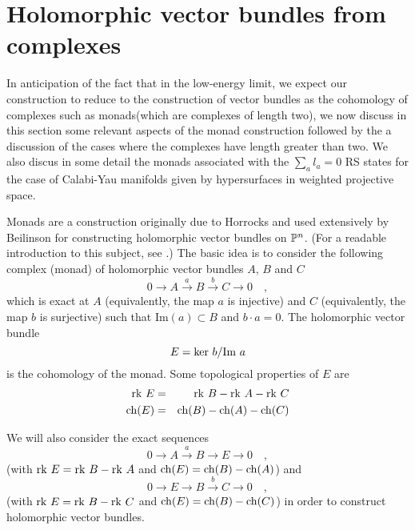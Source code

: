 \documentclass[a4paper,12pt]{article}
\begin{document}
\section{Holomorphic vector bundles from complexes}

In anticipation of the fact that in the low-energy limit, we expect
our construction to reduce to the construction of vector bundles
as the cohomology of complexes such as monads(which are complexes of
length two),
we now discuss in this section
some relevant aspects of the monad construction followed by the a
discussion of the cases where the complexes  have length greater than
two.
We also discus in some detail
the monads associated with the $\sum_al_a=0$ RS states for the case of
Calabi-Yau manifolds given by hypersurfaces in weighted projective
space.


Monads are a construction originally due to Horrocks and used extensively by
Beilinson for constructing holomorphic vector
bundles on $\mathbb P^n$. (For a readable introduction to this subject, see
\cite{okonek}.)
The basic idea is to consider the following complex 
(monad) of holomorphic vector bundles  $A$, $B$ and $C$ 
\begin{equation}
0\rightarrow A \stackrel{a}{\rightarrow} B \stackrel{b}{\rightarrow}
C \rightarrow 0\quad,
\end{equation}
which is exact at $A$ (equivalently, the map $a$ is injective)
and $C$ (equivalently, the map $b$ is surjective)
such that Im$(a)\subset B$ and $b\cdot a=0$.
The holomorphic
vector bundle $$E={\rm ker}\ b/{\rm Im}\ a$$ is the cohomology of the
monad.  Some topological properties of $E$ are
\begin{eqnarray}
{\rm rk}\ E &=& {\rm rk}\ B - {\rm rk}\ A - {\rm rk}\ C \\
{\rm ch}(E) &=& {\rm ch}(B) - {\rm ch}(A) -{\rm ch}(C)
\end{eqnarray}


We will also consider the exact sequences
$$
0\rightarrow A \stackrel{a}{\rightarrow} B \rightarrow
E \rightarrow 0\quad,
$$
(with ${\rm rk}\ E = {\rm rk}\ B - {\rm rk}\ A$ and
${\rm ch}(E) = {\rm ch}(B) - {\rm ch}(A)$)
and 
$$
0\rightarrow E \rightarrow B \stackrel{b}{\rightarrow}
C \rightarrow 0\quad,
$$
(with ${\rm rk}\ E = {\rm rk}\ B - {\rm rk}\ C$ and
${\rm ch}(E) = {\rm ch}(B) - {\rm ch}(C)$)
in order to construct holomorphic vector bundles. 
\end{document}
